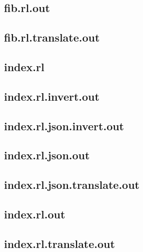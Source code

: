 \subsection{fib.rl.out}
\label{app:fib_rl.out}

\subsection{fib.rl.translate.out}
\label{app:fib_rl.translate.out}

\subsection{index.rl}
\label{app:index_rl}

\subsection{index.rl.invert.out}
\label{app:index_rl.invert.out}

\subsection{index.rl.json.invert.out}
\label{app:index_rl.json.invert.out}

\subsection{index.rl.json.out}
\label{app:index_rl.json.out}

\subsection{index.rl.json.translate.out}
\label{app:index_rl.json.translate.out}

\subsection{index.rl.out}
\label{app:index_rl.out}

\subsection{index.rl.translate.out}
\label{app:index_rl.translate.out}


